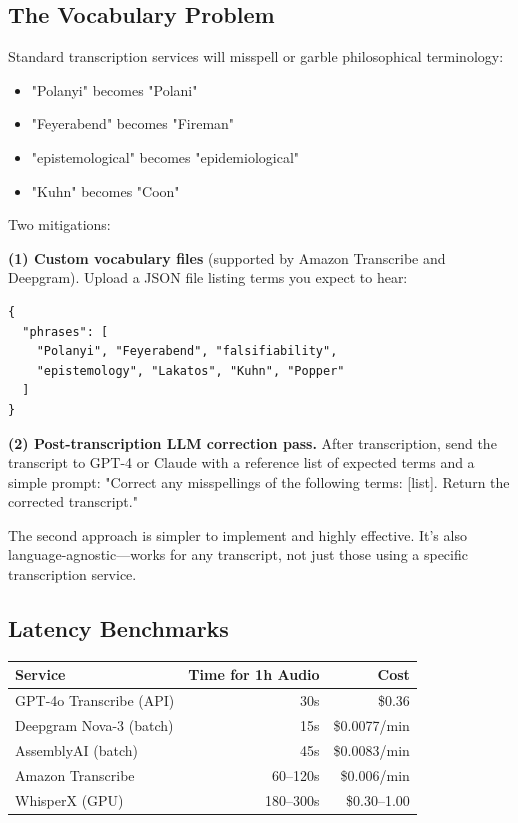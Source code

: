 \documentclass[11pt,letterpaper]{article}
\begin{document}
\subsection{The Vocabulary Problem}

Standard transcription services will misspell or garble philosophical terminology:

\begin{itemize}
  \item "Polanyi" becomes "Polani"
  \item "Feyerabend" becomes "Fireman"
  \item "epistemological" becomes "epidemiological"
  \item "Kuhn" becomes "Coon"
\end{itemize}

Two mitigations:

\textbf{(1) Custom vocabulary files} (supported by Amazon Transcribe and Deepgram). Upload a JSON file listing terms you expect to hear:

\begin{verbatim}
{
  "phrases": [
    "Polanyi", "Feyerabend", "falsifiability",
    "epistemology", "Lakatos", "Kuhn", "Popper"
  ]
}
\end{verbatim}

\textbf{(2) Post-transcription LLM correction pass.} After transcription, send the transcript to GPT-4 or Claude with a reference list of expected terms and a simple prompt: "Correct any misspellings of the following terms: [list]. Return the corrected transcript."

The second approach is simpler to implement and highly effective. It's also language-agnostic—works for any transcript, not just those using a specific transcription service.

\subsection{Latency Benchmarks}

\begin{center}
\begin{tabular}{lrr}
\toprule
\textbf{Service} & \textbf{Time for 1h Audio} & \textbf{Cost} \\
\midrule
GPT-4o Transcribe (API) & 30s & \$0.36 \\
Deepgram Nova-3 (batch) & 15s & \$0.0077/min \\
AssemblyAI (batch) & 45s & \$0.0083/min \\
Amazon Transcribe & 60–120s & \$0.006/min \\
WhisperX (GPU) & 180–300s & \$0.30–1.00 \\
\bottomrule
\end{tabular}
\end{center}
\end{document}
